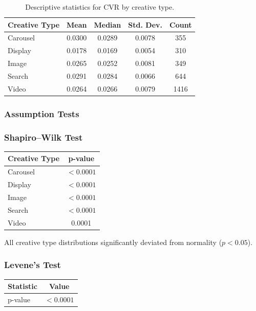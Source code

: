 \begin{table}[H]
	\centering
	\caption{Descriptive statistics for CVR by creative type.}
	\begin{tabular}{lcccc}
		\toprule
		Creative Type & Mean & Median & Std. Dev. & Count \\
		\midrule
		Carousel & 0.0300 & 0.0289 & 0.0078 & 355 \\
		Display & 0.0178 & 0.0169 & 0.0054 & 310 \\
		Image & 0.0265 & 0.0252 & 0.0081 & 349 \\
		Search & 0.0291 & 0.0284 & 0.0066 & 644 \\
		Video & 0.0264 & 0.0266 & 0.0079 & 1416 \\
		\bottomrule
	\end{tabular}
\end{table}

\subsubsection{Assumption Tests}

\subsubsection{Shapiro--Wilk Test}

\begin{table}[H]
	\centering
	\begin{tabular}{lc}
		\toprule
		Creative Type & p-value \\
		\midrule
		Carousel & $<0.0001$ \\
		Display & $<0.0001$ \\
		Image & $<0.0001$ \\
		Search & $<0.0001$ \\
		Video & 0.0001 \\
		\bottomrule
	\end{tabular}
\end{table}

All creative type distributions significantly deviated from normality ($p<0.05$).

\vspace{0.3cm}

\subsubsection{Levene's Test}

\begin{table}[H]
	\centering
	\begin{tabular}{lc}
		\toprule
		Statistic & Value \\
		\midrule
		p-value & $<0.0001$ \\
		\bottomrule
	\end{tabular}
\end{table}

